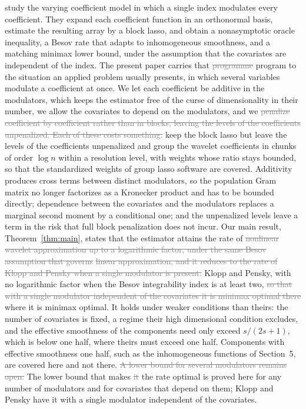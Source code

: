 \documentclass[12pt]{article} %
\theoremstyle{definition}
\theoremstyle{plain}
\begin{document}
\citet{Klopp-Pensky-2015} study the varying coefficient model in which a
single index modulates every coefficient. They expand each coefficient
function in an orthonormal basis, estimate the resulting array by a block
lasso, and obtain a nonasymptotic oracle inequality, a Besov rate that adapts
to inhomogeneous smoothness, and a matching minimax lower bound, under the
assumption that the covariates are independent of the index. The present paper
carries that \textcolor{gray}{\sout{programme}} \textcolor{colR1}{program} to the situation an applied problem usually presents,
in which several variables modulate a coefficient at once. We let each
coefficient be additive in the modulators, which keeps the estimator free of
the curse of dimensionality in their number, we allow the covariates to depend
on the modulators, and we \textcolor{gray}{\sout{penalize coefficient by coefficient rather than in
blocks, leaving the levels of the coefficients unpenalized. Each of these
costs something.}} \textcolor{colR1}{keep the block lasso but leave the levels of the
coefficients unpenalized and group the wavelet coefficients in chunks of order
$\log n$ within a resolution level, with weights whose ratio stays bounded, so
that the standardized weights of group lasso software are covered.}
Additivity produces cross terms between distinct modulators,
so the population Gram matrix no longer factorizes as a Kronecker product and
has to be bounded directly; dependence between the covariates and the
modulators replaces a marginal second moment by a conditional one; and the
unpenalized levels leave a term in the risk that \textcolor{colR1}{full} block penalization does not
incur. Our main result, Theorem~\ref{thm:main}, states that the estimator
attains the rate of \textcolor{gray}{\sout{nonlinear wavelet approximation up to a logarithmic
factor, under the same Besov assumption that governs}} \textcolor{gray}{\sout{linear approximation}}\textcolor{gray}{\sout{, and it
reduces to the rate of Klopp and Pensky when a single modulator is present.}}
\textcolor{colR1}{Klopp and Pensky, with no logarithmic factor when the Besov integrability
index is at least two, \textcolor{gray}{\sout{so that with a single modulator independent of the
covariates it is minimax optimal there}}
where it is minimax optimal. It holds under weaker conditions than
theirs: the number of covariates is fixed, a regime their high dimensional
condition excludes, and the effective smoothness of the components need only
exceed $s/(2s+1)$, which is below one half, where theirs must exceed one half.
Components with effective smoothness one half, such as the inhomogeneous
functions of Section~5, are covered here and not there. \textcolor{gray}{\sout{A lower bound for
several modulators remains open.}}
The lower bound that makes \textcolor{gray}{\sout{it}} the rate optimal is proved here for any number of
modulators and for covariates that depend on them; Klopp and Pensky have it
with a single modulator independent of the covariates.}
\end{document}
